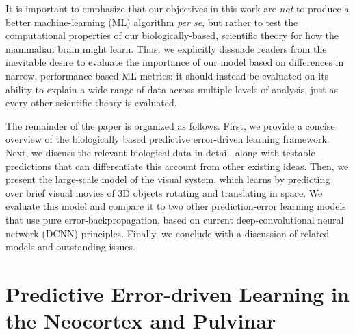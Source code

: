 \documentclass[11pt,twoside]{article}
\newif\myifpdf
\begin{document}
It is important to emphasize that our objectives in this work are \emph{not} to produce a better machine-learning (ML) algorithm \emph{per se}, but rather to test the computational properties of our biologically-based, scientific theory for how the mammalian brain might learn.  Thus, we explicitly dissuade readers from the inevitable desire to evaluate the importance of our model based on differences in narrow, performance-based ML metrics: it should instead be evaluated on its ability to explain a wide range of data across multiple levels of analysis, just as every other scientific theory is evaluated.

The remainder of the paper is organized as follows.  First, we provide a concise overview of the biologically based predictive error-driven learning framework.  Next, we discuss the relevant biological data in detail, along with testable predictions that can differentiate this account from other existing ideas.  Then, we present the large-scale model of the visual system, which learns by predicting over brief visual movies of 3D objects rotating and translating in space.  We evaluate this model and compare it to two other prediction-error learning models that use pure error-backpropagation, based on current deep-convolutional neural network (DCNN) principles. Finally, we conclude with a discussion of related models and outstanding issues.

\section{Predictive Error-driven Learning in the Neocortex and Pulvinar}
\end{document}
